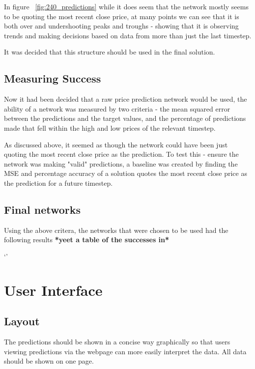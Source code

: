             In figure ~\ref{fig:240_predictions} while it does seem that the network mostly seems to be quoting the most recent close price, at many points we can see that it is both over and undershooting peaks and troughs - showing that it is observing trends and making decisions based on data from more than just the last timestep.

            It was decided that this structure should be used in the final solution.


        \subsection{Measuring Success}

        Now it had been decided that a raw price prediction network would be used, the ability of a network was measured by two criteria - the mean squared error between the predictions and the target values, and the percentage of predictions made that fell within the high and low prices of the relevant timestep.

        As discussed above, it seemed as though the network could have been just quoting the most recent close price as the prediction. To test this - ensure the network was making "valid" predictions, a baseline was created by finding the MSE and percentage accuracy of a solution quotes the most recent close price as the prediction for a future timestep. 


        \subsection{Final networks}

        Using the above critera, the networks that were chosen to be used had the following results
        \textbf{*yeet a table of the successes in*}
        
`'
    \section{User Interface}

        \subsection{Layout}
        The predictions should be shown in a concise way graphically so that users viewing predictions via the webpage can more easily interpret the data. All data should be shown on one page.
        
